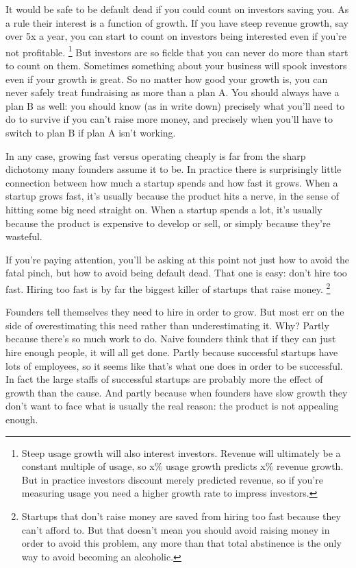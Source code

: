 \documentclass[12pt]{book}
\begin{document}
It would be safe to be default dead if you could count on investors
saving you. As a rule their interest is a function of growth. If you
have steep revenue growth, say over 5x a year, you can start to count on
investors being interested even if you're not profitable.
\footnote{Steep usage growth will also interest investors. Revenue will
ultimately be a constant multiple of usage, so x\% usage growth predicts
x\% revenue growth. But in practice investors discount merely predicted
revenue, so if you're measuring usage you need a higher growth rate to
impress investors.} But investors are so fickle that you can never
do more than start to count on them. Sometimes something about your
business will spook investors even if your growth is great. So no matter
how good your growth is, you can never safely treat fundraising as more
than a plan A. You should always have a plan B as well: you should know
(as in write down) precisely what you'll need to do to survive if you
can't raise more money, and precisely when you'll have to switch to plan
B if plan A isn't working.

In any case, growing fast versus operating cheaply is far from the sharp
dichotomy many founders assume it to be. In practice there is
surprisingly little connection between how much a startup spends and how
fast it grows. When a startup grows fast, it's usually because the
product hits a nerve, in the sense of hitting some big need straight on.
When a startup spends a lot, it's usually because the product is
expensive to develop or sell, or simply because they're wasteful.

If you're paying attention, you'll be asking at this point not just how
to avoid the fatal pinch, but how to avoid being default dead. That one
is easy: don't hire too fast. Hiring too fast is by far the biggest
killer of startups that raise money. \footnote{Startups that don't raise money are saved from hiring too fast
because they can't afford to. But that doesn't mean you should avoid
raising money in order to avoid this problem, any more than that total
abstinence is the only way to avoid becoming an alcoholic.}

Founders tell themselves they need to hire in order to grow. But most
err on the side of overestimating this need rather than underestimating
it. Why? Partly because there's so much work to do. Naive founders think
that if they can just hire enough people, it will all get done. Partly
because successful startups have lots of employees, so it seems like
that's what one does in order to be successful. In fact the large staffs
of successful startups are probably more the effect of growth than the
cause. And partly because when founders have slow growth they don't want
to face what is usually the real reason: the product is not appealing
enough.
\end{document}
